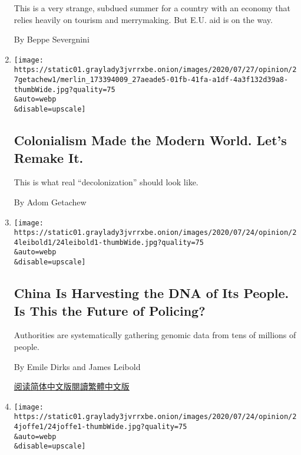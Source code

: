 \begin{enumerate}
  This is a very strange, subdued summer for a country with an economy
  that relies heavily on tourism and merrymaking. But E.U. aid is on the
  way.

  By Beppe Severgnini
\item
  \href{/2020/07/27/opinion/decolonization-statues.html}{}

  \texttt{[image: https://static01.graylady3jvrrxbe.onion/images/2020/07/27/opinion/27getachew1/merlin\_173394009\_27aeade5-01fb-41fa-a1df-4a3f132d39a8-thumbWide.jpg?quality=75\\\&auto=webp\\\&disable=upscale]}

  \hypertarget{colonialism-made-the-modern-world-lets-remake-it}{%
  \subsection{Colonialism Made the Modern World. Let's Remake
  It.}\label{colonialism-made-the-modern-world-lets-remake-it}}

  This is what real ``decolonization'' should look like.

  By Adom Getachew
\item
  \href{/2020/07/24/opinion/china-dna-police.html}{}

  \texttt{[image: https://static01.graylady3jvrrxbe.onion/images/2020/07/24/opinion/24leibold1/24leibold1-thumbWide.jpg?quality=75\\\&auto=webp\\\&disable=upscale]}

  \hypertarget{china-is-harvesting-the-dna-of-its-people-is-this-the-future-of-policing}{%
  \subsection{China Is Harvesting the DNA of Its People. Is This the
  Future of
  Policing?}\label{china-is-harvesting-the-dna-of-its-people-is-this-the-future-of-policing}}

  Authorities are systematically gathering genomic data from tens of
  millions of people.

  By Emile Dirks and James Leibold

  \href{https://cn.nytimes3xbfgragh.onion/opinion/20200728/china-dna-police/}{阅读简体中文版}\href{https://cn.nytimes3xbfgragh.onion/opinion/20200728/china-dna-police/zh-hant/}{閱讀繁體中文版}
\item
  \href{/2020/07/24/opinion/united-states-europe-china.html}{}

  \texttt{[image: https://static01.graylady3jvrrxbe.onion/images/2020/07/24/opinion/24joffe1/24joffe1-thumbWide.jpg?quality=75\\\&auto=webp\\\&disable=upscale]}


\end{enumerate}
